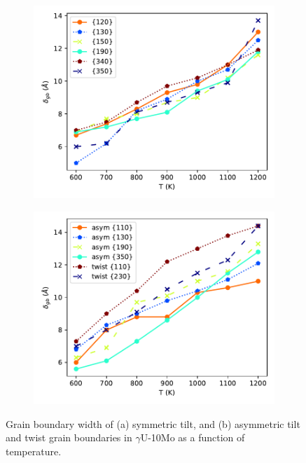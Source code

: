 \documentclass{elsarticle}
\begin{document}
\begin{figure}[!ht]
\begin{subfigure}{0.49\textwidth}
	\centering
	\caption{}
	\includegraphics[width=\textwidth]{d_gb_sym.pdf}
\end{subfigure}
\begin{subfigure}{0.49\textwidth}
	\centering
	\caption{}
	\includegraphics[width=\textwidth]{d_gb_asym_twist.pdf}
\end{subfigure}
\caption{Grain boundary width of (a) symmetric tilt, and (b) asymmetric tilt and twist grain boundaries in $\gamma$U-10Mo as a function of temperature.}
\label{fig:delta}
\end{figure}
\end{document}
